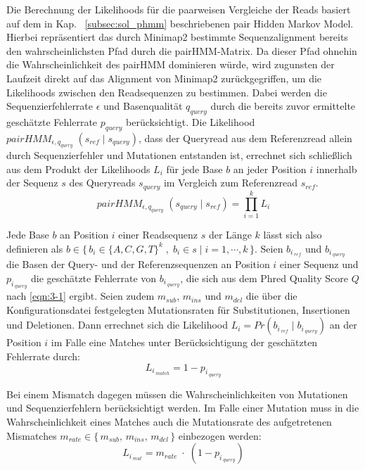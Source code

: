 Die Berechnung der Likelihoods für die paarweisen Vergleiche der Reads basiert auf dem in Kap. ~\ref{subsec:sol_phmm} beschriebenen pair Hidden Markov Model. Hierbei repräsentiert das durch Minimap2 bestimmte Sequenzalignment bereits den wahrscheinlichsten Pfad durch die pairHMM-Matrix. Da dieser Pfad ohnehin die Wahrscheinlichkeit des pairHMM dominieren würde, wird zugunsten der Laufzeit direkt auf das Alignment von Minimap2 zurückgegriffen, um die Likelihoods zwischen den Readsequenzen zu bestimmen. Dabei werden die Sequenzierfehlerrate $ \epsilon $ und Basenqualität $ q_{query} $ durch die bereits zuvor ermittelte geschätzte Fehlerrate $ p_{query} $ berücksichtigt. Die Likelihood $ pairHMM_{\epsilon, q_{query}} \;(s_{ref}\;|\; s_{query}) $, dass der Queryread aus dem Referenzread allein durch Sequenzierfehler und Mutationen entstanden ist, errechnet sich schließlich aus dem Produkt der Likelihoods $ L_{i} $ für jede Base $ b $ an jeder Position $ i $ innerhalb der Sequenz $ s $ des Queryreads $ s_{query} $ im Vergleich zum Referenzread $ s_{ref} $.
\begin{equation} \label{eqn:3-2}
\tag{3-2}
pairHMM_{\epsilon, q_{query}} \;(s_{query}\;|\; s_{ref}) = \prod_{i=1}^{k}L_{i}
\end{equation}

Jede Base $ b $ an Position $ i $ einer Readsequenz $ s $ der Länge $ k $ lässt sich also definieren als $ b \in \{\,b_{i}\in \{A,C,G,T\}^k\;,\; b_{i} \in s \;|\; i = 1, \dotsb, k \,\}$. Seien $ b_{i\,_{ref}} $ und $ b_{i\,_{query}} $ die Basen der Query- und der Referenzsequenzen an Position $ i $ einer Sequenz und $  p_{i\,_{query}} $ die geschätzte Fehlerrate von $ b_{i\,_{query}} $, die sich aus dem Phred Quality Score $ Q $ nach  \eqref{eqn:3-1} ergibt. Seien zudem $ m_{sub} $, $ m_{ins} $ und $ m_{del} $ die über die Konfigurationsdatei festgelegten Mutationsraten für Substitutionen, Insertionen und Deletionen. Dann errechnet sich die Likelihood $ L_{i} = Pr(b_{i\,_{ref}}\;|\; b_{i\,_{query}})$ an der Position $ i $ im Falle eine Matches unter Berücksichtigung der geschätzten Fehlerrate durch:
\begin{equation} \label{eqn:3-3}
\tag{3-3}
L_{i\,_{match}} = 1 - p_{i\,_{query}}
\end{equation}

Bei einem Mismatch dagegen müssen die Wahrscheinlichkeiten von Mutationen und Sequenzierfehlern berücksichtigt werden. Im Falle einer Mutation muss in die Wahrscheinlichkeit eines Matches auch die Mutationsrate des aufgetretenen Mismatches $ m_{rate} \in \{\,m_{sub},\,  m_{ins},\, m_{del}\,\} $ einbezogen werden:
\begin{equation} \label{eqn:3-4}
\tag{3-4}
L_{i\,_{mut}} = m_{rate}\; \cdotp \;(1 - p_{i\,_{query}})
\end{equation}

